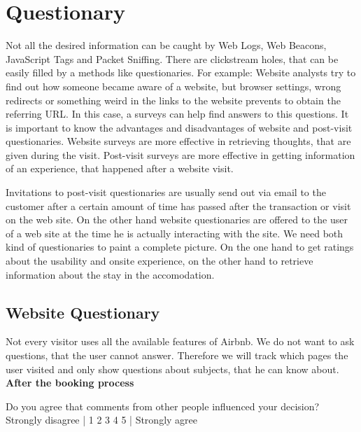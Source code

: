 \section{Questionary}
\label{sec:Questionary}
Not all the desired information can be caught by Web Logs, Web Beacons, JavaScript Tags and Packet Sniffing. There are clickstream holes, that can be easily filled by a methods like questionaries. For example: Website analysts try to find out how someone became aware of a website, but browser settings, wrong redirects or something weird in the links to the website prevents to obtain the referring URL. In this case, a surveys can help find answers to this questions. \citep[p. 64]{Kaushik07} It is important to know the advantages and disadvantages of website and post-visit questionaries. Website surveys are more effective in retrieving thoughts, that are given during the visit. Post-visit surveys are more effective in getting information of an experience, that happened after a website visit. 
\vspace{0.2cm}

Invitations to post-visit questionaries are usually send out via email to the customer after a certain amount of time has passed after the transaction or visit on the web site. On the other hand website questionaries are offered to the user of a web site at the time he is actually interacting with the site. \citep[p. 65-66]{Kaushik07} We need both kind of questionaries to paint a complete picture. On the one hand to get ratings about the usability and onsite experience, on the other hand to retrieve information about the stay in the accomodation.

\subsection{Website Questionary}
\label{sec:Website_Questionary}

Not every visitor uses all the available features of Airbnb. We do not want to ask questions, that the user cannot answer. Therefore we will track which pages the user visited and only show questions about subjects, that he can know about.\\

\textbf{After the booking process}

\vspace{0.2cm}

Do you agree that comments from other people influenced your decision?
\newline 
Strongly disagree | 1 2 3 4 5 | Strongly agree \\

